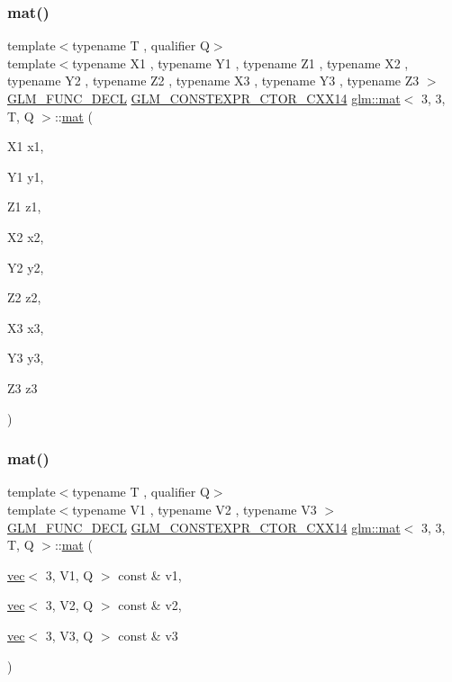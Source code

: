 \subsubsection{\texorpdfstring{mat()}{mat()}\hspace{0.1cm}{\footnotesize\ttfamily [7/21]}}
{\footnotesize\ttfamily template$<$typename T , qualifier Q$>$ \\
template$<$typename X1 , typename Y1 , typename Z1 , typename X2 , typename Y2 , typename Z2 , typename X3 , typename Y3 , typename Z3 $>$ \\
\mbox{\hyperlink{setup_8hpp_ab2d052de21a70539923e9bcbf6e83a51}{G\+L\+M\+\_\+\+F\+U\+N\+C\+\_\+\+D\+E\+CL}} \mbox{\hyperlink{setup_8hpp_a0900f9145e68bf6061b6f5e7be3fa751}{G\+L\+M\+\_\+\+C\+O\+N\+S\+T\+E\+X\+P\+R\+\_\+\+C\+T\+O\+R\+\_\+\+C\+X\+X14}} \mbox{\hyperlink{structglm_1_1mat}{glm\+::mat}}$<$ 3, 3, T, Q $>$\+::\mbox{\hyperlink{structglm_1_1mat}{mat}} (\begin{DoxyParamCaption}\item[{X1}]{x1,  }\item[{Y1}]{y1,  }\item[{Z1}]{z1,  }\item[{X2}]{x2,  }\item[{Y2}]{y2,  }\item[{Z2}]{z2,  }\item[{X3}]{x3,  }\item[{Y3}]{y3,  }\item[{Z3}]{z3 }\end{DoxyParamCaption})}

\mbox{\label{structglm_1_1mat_3_013_00_013_00_01_t_00_01_q_01_4_ae25c721fb8fd4496b8430fc9040b04be}} 
\subsubsection{\texorpdfstring{mat()}{mat()}\hspace{0.1cm}{\footnotesize\ttfamily [8/21]}}
{\footnotesize\ttfamily template$<$typename T , qualifier Q$>$ \\
template$<$typename V1 , typename V2 , typename V3 $>$ \\
\mbox{\hyperlink{setup_8hpp_ab2d052de21a70539923e9bcbf6e83a51}{G\+L\+M\+\_\+\+F\+U\+N\+C\+\_\+\+D\+E\+CL}} \mbox{\hyperlink{setup_8hpp_a0900f9145e68bf6061b6f5e7be3fa751}{G\+L\+M\+\_\+\+C\+O\+N\+S\+T\+E\+X\+P\+R\+\_\+\+C\+T\+O\+R\+\_\+\+C\+X\+X14}} \mbox{\hyperlink{structglm_1_1mat}{glm\+::mat}}$<$ 3, 3, T, Q $>$\+::\mbox{\hyperlink{structglm_1_1mat}{mat}} (\begin{DoxyParamCaption}\item[{\mbox{\hyperlink{structglm_1_1vec}{vec}}$<$ 3, V1, Q $>$ const \&}]{v1,  }\item[{\mbox{\hyperlink{structglm_1_1vec}{vec}}$<$ 3, V2, Q $>$ const \&}]{v2,  }\item[{\mbox{\hyperlink{structglm_1_1vec}{vec}}$<$ 3, V3, Q $>$ const \&}]{v3 }\end{DoxyParamCaption})}

